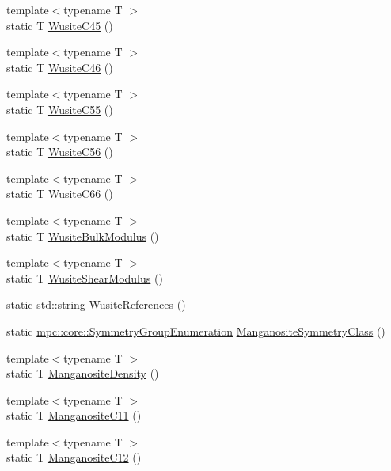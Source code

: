 \begin{DoxyCompactItemize}
\item 
{\footnotesize template$<$typename T $>$ }\\static T \mbox{\hyperlink{namespacempc_1_1data_a93d0f44c91d26a05c02787ecc5a664f8}{Wusite\+C45}} ()
\item 
{\footnotesize template$<$typename T $>$ }\\static T \mbox{\hyperlink{namespacempc_1_1data_ab8e71b9d408ba45259e3a8771930621d}{Wusite\+C46}} ()
\item 
{\footnotesize template$<$typename T $>$ }\\static T \mbox{\hyperlink{namespacempc_1_1data_aa93a5d1fd8af0d73f89dabd505b02321}{Wusite\+C55}} ()
\item 
{\footnotesize template$<$typename T $>$ }\\static T \mbox{\hyperlink{namespacempc_1_1data_a5796a16a770ca573c478a2d26c3b0529}{Wusite\+C56}} ()
\item 
{\footnotesize template$<$typename T $>$ }\\static T \mbox{\hyperlink{namespacempc_1_1data_a4e5fc93edff67c7a03b8f27940bd664d}{Wusite\+C66}} ()
\item 
{\footnotesize template$<$typename T $>$ }\\static T \mbox{\hyperlink{namespacempc_1_1data_a1d8071d158a75ed5ded083a08ff99f54}{Wusite\+Bulk\+Modulus}} ()
\item 
{\footnotesize template$<$typename T $>$ }\\static T \mbox{\hyperlink{namespacempc_1_1data_a93bda58f4ced43c1b4ea8885f40eb3c9}{Wusite\+Shear\+Modulus}} ()
\item 
static std\+::string \mbox{\hyperlink{namespacempc_1_1data_a37620d942125f180252c5e13c993630e}{Wusite\+References}} ()
\item 
static \mbox{\hyperlink{namespacempc_1_1core_a9d979684062547055a0ef5c13077bad8}{mpc\+::core\+::\+Symmetry\+Group\+Enumeration}} \mbox{\hyperlink{namespacempc_1_1data_a93b096db59d25166a11a1d508477be1c}{Manganosite\+Symmetry\+Class}} ()
\item 
{\footnotesize template$<$typename T $>$ }\\static T \mbox{\hyperlink{namespacempc_1_1data_a5092fbe2c43c4c823996a230fc048bdd}{Manganosite\+Density}} ()
\item 
{\footnotesize template$<$typename T $>$ }\\static T \mbox{\hyperlink{namespacempc_1_1data_ad3c36944afa8780864e2135ef6d1a44f}{Manganosite\+C11}} ()
\item 
{\footnotesize template$<$typename T $>$ }\\static T \mbox{\hyperlink{namespacempc_1_1data_a66edd5a400bc2d6937178782a3a3ea12}{Manganosite\+C12}} ()

\end{DoxyCompactItemize}
